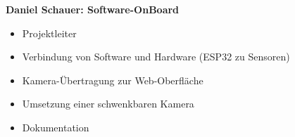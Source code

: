 \documentclass[ngerman,12pt,a4paper]{article}
\begin{document}
\begin{center}
\begin{minipage}{0.65\textwidth}
				\vspace{-40pt}
				\textbf{Daniel Schauer: Software-OnBoard}
				\begin{itemize}
					\item Projektleiter \vspace{-10pt}
					\item Verbindung von Software und Hardware (ESP32 zu Sensoren) \vspace{-10pt}
					\item Kamera-Übertragung zur Web-Oberfläche \vspace{-10pt}
					\item Umsetzung einer schwenkbaren Kamera \vspace{-10pt}
					\item Dokumentation \vspace{-10pt}
				\end{itemize}
			\end{minipage} \\[1cm]
		

\end{center}
\end{document}
